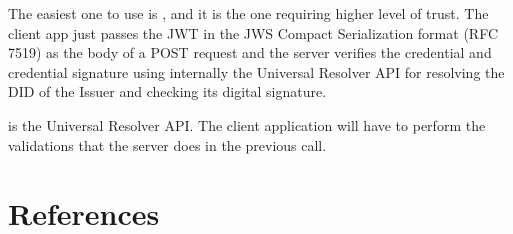 \documentclass[a4paper,12pt,english]{sphinxhowto}
\begin{document}
\sphinxAtStartPar
The easiest one to use is , and it is the one requiring higher level of trust. The client app just passes the JWT in the JWS Compact Serialization format (RFC 7519) as the body of a POST request and the server verifies the credential and credential signature using internally the Universal Resolver API for resolving the DID of the Issuer and checking its digital signature.

\sphinxAtStartPar
{} is the Universal Resolver API. The client application will have to perform the validations that the server does in the previous call.


\section{References}
\label{\detokenize{ssi/references:references}}\label{\detokenize{ssi/references::doc}}


\renewcommand{\indexname}{Index}
\printindex
\end{document}
